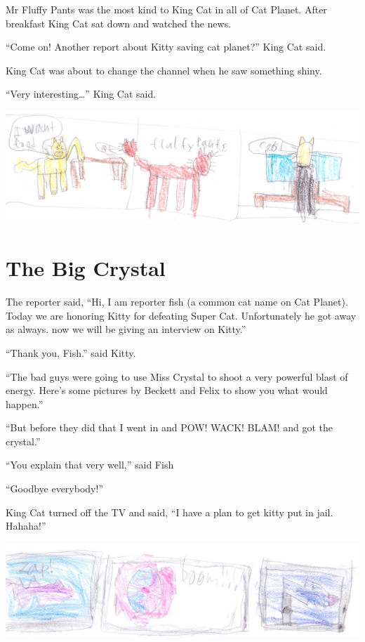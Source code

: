 \documentclass[12pt,oneside]{krantz}
\begin{document}
Mr Fluffy Pants was the most kind to King Cat in all of Cat Planet.
After breakfast King Cat sat down and watched the news.

``Come on! Another report about Kitty saving cat planet?'' King Cat
said.

King Cat was about to change the channel when he saw something shiny.

``Very interesting\ldots{}'' King Cat said.

\includegraphics{img/fluffypants.jpg}

\hypertarget{the-big-crystal}{%
\chapter{The Big Crystal}\label{the-big-crystal}}

The reporter said, ``Hi, I am reporter fish (a common cat name on Cat
Planet). Today we are honoring Kitty for defeating Super Cat.
Unfortunately he got away as always. now we will be giving an interview
on Kitty.''

``Thank you, Fish.'' said Kitty.

``The bad guys were going to use Miss Crystal to shoot a very powerful
blast of energy. Here's some pictures by Beckett and Felix to show you
what would happen.''

``But before they did that I went in and POW! WACK! BLAM! and got the
crystal.''

``You explain that very well,'' said Fish

``Goodbye everybody!''

King Cat turned off the TV and said, ``I have a plan to get kitty put in
jail. Hahaha!''

\includegraphics{img/boom.jpg}
\end{document}
